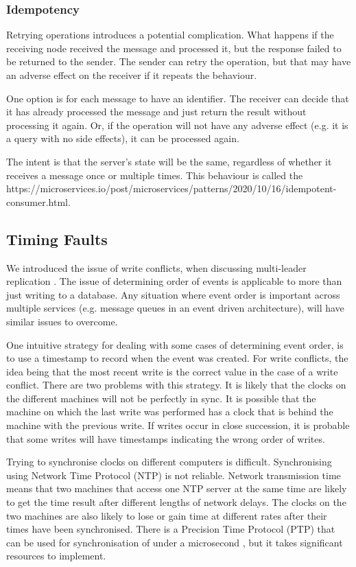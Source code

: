 \subsubsection{Idempotency}
Retrying operations introduces a potential complication.
What happens if the receiving node received the message and processed it, but the response failed to be returned to the sender.
The sender can retry the operation, but that may have an adverse effect on the receiver if it repeats the behaviour.

One option is for each message to have an identifier.
The receiver can decide that it has already processed the message and just return the result without processing it again.
Or, if the operation will not have any adverse effect (e.g. it is a query with no side effects), it can be processed again.

The intent is that the server's state will be the same, regardless of whether it receives a message once or multiple times.
This behaviour is called the 
{https://microservices.io/post/microservices/patterns/2020/10/16/idempotent-consumer.html}.

\subsection{Timing Faults}\label{timing}
We introduced the issue of write conflicts, when discussing multi-leader replication \cite{distributed2-notes}.
The issue of determining order of events is applicable to more than just writing to a database.
Any situation where event order is important across multiple services (e.g. message queues in an event driven architecture),
will have similar issues to overcome.

One intuitive strategy for dealing with some cases of determining event order,
is to use a timestamp to record when the event was created.
For write conflicts, the idea being that the most recent write is the correct value in the case of a write conflict.
There are two problems with this strategy.
It is likely that the clocks on the different machines will not be perfectly in sync.
It is possible that the machine on which the last write was performed has a clock that is behind the machine with the previous write.
If writes occur in close succession, it is probable that some writes will have timestamps indicating the wrong order of writes.

Trying to synchronise clocks on different computers is difficult.
Synchronising using Network Time Protocol (NTP) is not reliable.
Network transmission time means that two machines that access one NTP server at the same time
are likely to get the time result after different lengths of network delays.
The clocks on the two machines are also likely to lose or gain time at different rates after their times have been synchronised.
There is a Precision Time Protocol (PTP) that can be used for synchronisation of under a microsecond \cite{ieee-1588},
but it takes significant resources to implement.

